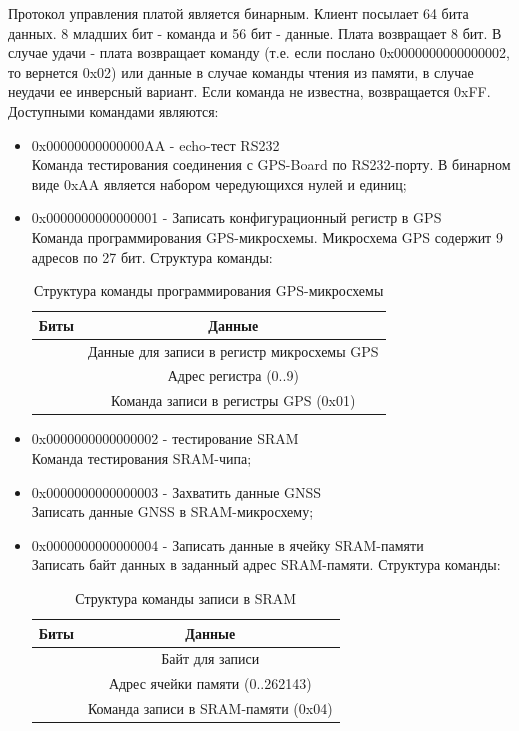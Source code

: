 Протокол управления платой является бинарным. Клиент посылает 64 бита данных.
8 младших бит - команда и 56 бит - данные. Плата возвращает 8 бит. В случае
удачи - плата возвращает команду (т.е. если послано 0x0000000000000002, то вернется 0x02) или данные в случае команды чтения из
памяти, в случае неудачи ее инверсный вариант. Если команда не известна, возвращается 0xFF.
Доступными командами являются:

\begin{itemize}
\item 0x00000000000000AA - echo-тест RS232 \\
	Команда тестирования соединения с GPS-Board по RS232-порту. В бинарном виде 0xAA является набором чередующихся нулей и единиц;

\item 0x0000000000000001 - Записать конфигурационный регистр в GPS \\ 
	Команда программирования GPS-микросхемы. Микросхема GPS содержит 9 адресов по 27 бит. Структура команды:
	\begin{table}[H]
	\begin{center}
	\caption{Структура команды программирования GPS-микросхемы}
	\label{tab:gps_programm_comm}
	\begin{tabular}{|c|c|}
		\hline
			Биты & Данные \\
		\hline
			[39:12] & Данные для записи в регистр микросхемы GPS \\
		\hline
			[11:08] & Адрес регистра (0..9) \\
		\hline
			[07:00] & Команда записи в регистры GPS (0x01) \\
		\hline
	\end{tabular}
	\end{center}
	\end{table}

\item 0x0000000000000002 - тестирование SRAM \\ 
	Команда тестирования SRAM-чипа;

\item 0x0000000000000003 - Захватить данные GNSS \\ 
	Записать данные GNSS в SRAM-микросхему;

\item 0x0000000000000004 - Записать данные в ячейку SRAM-памяти \\ 
	Записать байт данных в заданный адрес SRAM-памяти. Структура команды:
	\begin{table}[H]
	\begin{center}
	\caption{Структура команды записи в SRAM}
	\label{tab:write_sram}
	\begin{tabular}{|c|c|}
		\hline
			Биты & Данные \\
		\hline
			[33:26] & Байт для записи \\
		\hline
			[25:08] & Адрес ячейки памяти (0..262143) \\
		\hline
			[07:00] & Команда записи в SRAM-памяти (0x04) \\
		\hline
	\end{tabular}
	\end{center}
	\end{table}


\end{itemize}
